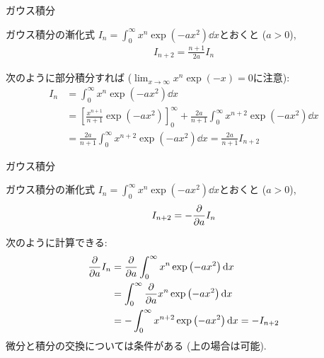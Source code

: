\documentclass[dvipdfmx,notheorems,t]{beamer}
\begin{document}
\begin{frame}{ガウス積分}
\begin{block}{ガウス積分の漸化式}
  $I_n = \int_0^\infty x^n \exp \left( -a x^2 \right) \dd{x}$とおくと ($a > 0$),
  \begin{align*}
    I_{n + 2} = \frac{n + 1}{2a} I_n
  \end{align*}
\end{block}

次のように部分積分すれば ($\lim_{x \to \infty} x^n \exp (-x) = 0$に注意):
\begin{align*}
  I_n &= \int_0^\infty x^n \exp \left( -a x^2 \right) \dd{x} \\
    &= \left[ \frac{x^{n + 1}}{n + 1} \exp \left( -a x^2 \right) \right]_0^\infty
      + \frac{2a}{n + 1} \int_0^\infty x^{n + 2} \exp \left( -a x^2 \right) \dd{x} \\
    &= \frac{2a}{n + 1} \int_0^\infty x^{n + 2} \exp \left( -a x^2 \right) \dd{x}
    = \frac{2a}{n + 1} I_{n + 2}
\end{align*}
\end{frame}

\begin{frame}{ガウス積分}
\begin{block}{ガウス積分の漸化式}
  $I_n = \int_0^\infty x^n \exp \left( -a x^2 \right) \dd{x}$とおくと ($a > 0$),
  \begin{align*}
    I_{n + 2} = -\pdv{a} I_n
  \end{align*}
\end{block}

次のように計算できる:
\begin{align*}
  \pdv{a} I_n &= \pdv{a} \int_0^\infty x^n \exp \left( -a x^2 \right) \dd{x} \\
    &= \int_0^\infty \pdv{a} x^n \exp \left( -a x^2 \right) \dd{x} \\
    &= - \int_0^\infty x^{n + 2} \exp \left( -a x^2 \right) \dd{x}
    = -I_{n + 2}
\end{align*}
微分と積分の交換については条件がある (上の場合は可能).
\end{frame}
\end{document}
